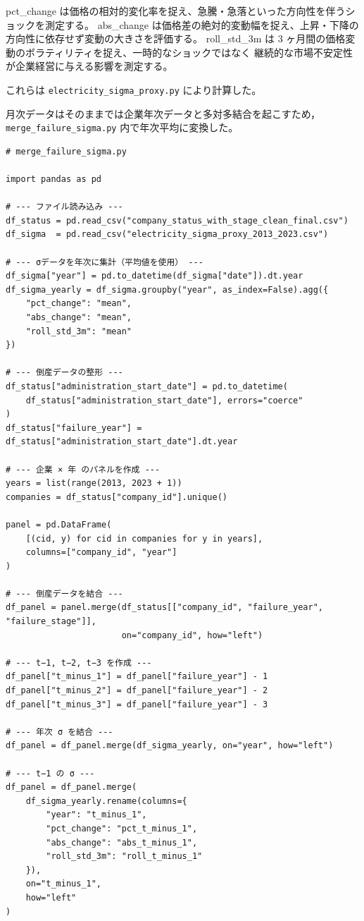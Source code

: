 pct\_change は価格の相対的変化率を捉え、急騰・急落といった方向性を伴うショックを測定する。
abs\_change は価格差の絶対的変動幅を捉え、上昇・下降の方向性に依存せず変動の大きさを評価する。
roll\_std\_3m は 3 ヶ月間の価格変動のボラティリティを捉え、一時的なショックではなく
継続的な市場不安定性が企業経営に与える影響を測定する。

これらは \texttt{electricity\_sigma\_proxy.py} により計算した。

月次データはそのままでは企業年次データと多対多結合を起こすため，
\texttt{merge\_failure\_sigma.py} 内で年次平均に変換した。

\begin{verbatim}
# merge_failure_sigma.py

import pandas as pd

# --- ファイル読み込み ---
df_status = pd.read_csv("company_status_with_stage_clean_final.csv")
df_sigma  = pd.read_csv("electricity_sigma_proxy_2013_2023.csv")

# --- σデータを年次に集計（平均値を使用） ---
df_sigma["year"] = pd.to_datetime(df_sigma["date"]).dt.year
df_sigma_yearly = df_sigma.groupby("year", as_index=False).agg({
    "pct_change": "mean",
    "abs_change": "mean",
    "roll_std_3m": "mean"
})

# --- 倒産データの整形 ---
df_status["administration_start_date"] = pd.to_datetime(
    df_status["administration_start_date"], errors="coerce"
)
df_status["failure_year"] = df_status["administration_start_date"].dt.year

# --- 企業 × 年 のパネルを作成 ---
years = list(range(2013, 2023 + 1))
companies = df_status["company_id"].unique()

panel = pd.DataFrame(
    [(cid, y) for cid in companies for y in years],
    columns=["company_id", "year"]
)

# --- 倒産データを結合 ---
df_panel = panel.merge(df_status[["company_id", "failure_year", "failure_stage"]],
                       on="company_id", how="left")

# --- t−1, t−2, t−3 を作成 ---
df_panel["t_minus_1"] = df_panel["failure_year"] - 1
df_panel["t_minus_2"] = df_panel["failure_year"] - 2
df_panel["t_minus_3"] = df_panel["failure_year"] - 3

# --- 年次 σ を結合 ---
df_panel = df_panel.merge(df_sigma_yearly, on="year", how="left")

# --- t−1 の σ ---
df_panel = df_panel.merge(
    df_sigma_yearly.rename(columns={
        "year": "t_minus_1",
        "pct_change": "pct_t_minus_1",
        "abs_change": "abs_t_minus_1",
        "roll_std_3m": "roll_t_minus_1"
    }),
    on="t_minus_1",
    how="left"
)


\end{verbatim}
